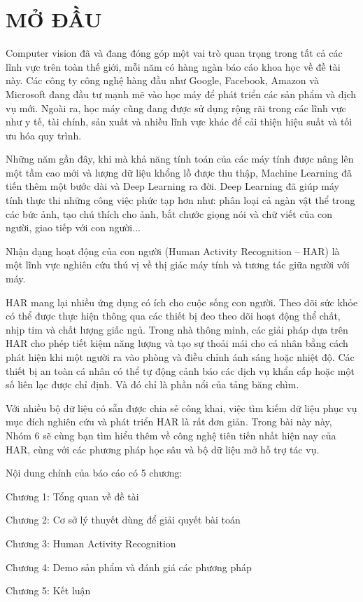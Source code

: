 \chapter*{MỞ ĐẦU}

\label{Chapter0} 

Computer vision đã và đang đóng góp một vai trò quan trọng trong tất cả các lĩnh vực trên toàn thế giới, mỗi năm có hàng ngàn báo cáo khoa học về đề tài này. Các công ty công nghệ hàng đầu như Google, Facebook, Amazon và Microsoft đang đầu tư mạnh mẽ vào học máy để phát triển các sản phẩm và dịch vụ mới. Ngoài ra, học máy cũng đang được sử dụng rộng rãi trong các lĩnh vực như y tế, tài chính, sản xuất và nhiều lĩnh vực khác để cải thiện hiệu suất và tối ưu hóa quy trình.

Những năm gần đây, khi mà khả năng tính toán của các máy tính được nâng lên một tầm cao mới và lượng dữ liệu khổng lồ được thu thập, Machine Learning đã tiến thêm một bước dài và Deep Learning ra đời. Deep Learning đã giúp máy tính thực thi những công việc phức tạp hơn như: phân loại cả ngàn vật thể trong các bức ảnh, tạo chú thích cho ảnh, bắt chước giọng nói và chữ viết của con người, giao tiếp với con người...

Nhận dạng hoạt động của con người (Human Activity Recognition – HAR) là một lĩnh vực nghiên cứu thú vị về thị giác máy tính và tương tác giữa người với máy.

HAR mang lại nhiều ứng dụng có ích cho cuộc sống con người. Theo dõi sức khỏe có thể được thực hiện thông qua các thiết bị đeo theo dõi hoạt động thể chất, nhịp tim và chất lượng giấc ngủ. Trong nhà thông minh, các giải pháp dựa trên HAR cho phép tiết kiệm năng lượng và tạo sự thoải mái cho cá nhân bằng cách phát hiện khi một người ra vào phòng và điều chỉnh ánh sáng hoặc nhiệt độ. Các thiết bị an toàn cá nhân có thể tự động cảnh báo các dịch vụ khẩn cấp hoặc một số liên lạc được chỉ định. Và đó chỉ là phần nổi của tảng băng chìm.

Với nhiều bộ dữ liệu có sẵn được chia sẻ công khai, việc tìm kiếm dữ liệu phục vụ mục đích nghiên cứu và phát triển HAR là rất đơn giản. Trong bài này này, Nhóm 6 sẽ cùng bạn tìm hiểu thêm về công nghệ tiên tiến nhất hiện nay của HAR, cùng với các phương pháp học sâu và bộ dữ liệu mở hỗ trợ tác vụ.


 

Nội dung chính của báo cáo có 5 chương:

Chương 1: Tổng quan về đề tài

Chương 2: Cơ sở lý thuyết dùng để giải quyết bài toán

Chương 3: Human Activity Recognition 

Chương 4: Demo sản phẩm và đánh giá các phương pháp

Chương 5: Kết luận  
 


